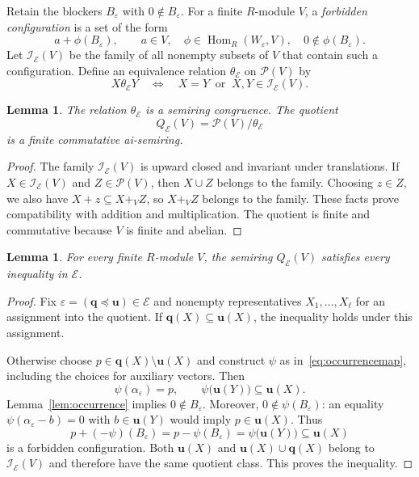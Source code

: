 \documentclass[11pt,reqno]{amsart}
\newtheorem{lemma}[theorem]{Lemma}
\theoremstyle{definition}
\numberwithin{equation}{section}
\newcommand{\Pow}{\mathcal{P}}
\newcommand{\Hom}{\operatorname{Hom}}
\newcommand{\bu}{\mathbf{u}}
\newcommand{\bq}{\mathbf{q}}
\newcommand{\calI}{\mathcal{I}}
\newcommand{\calE}{\mathcal{E}}
\begin{document}
Retain the blockers $B_\varepsilon$ with $0\notin B_\varepsilon$. For a finite $R$-module $V$, a \emph{forbidden configuration} is a set of the form
\begin{equation}\label{eq:forbidden}
 a+\phi(B_\varepsilon),\qquad
 a\in V,\quad\phi\in\Hom_R(W_\varepsilon,V),\quad
 0\notin\phi(B_\varepsilon).
\end{equation}
Let $\calI_{\calE}(V)$ be the family of all nonempty subsets of $V$ that contain such a configuration. Define an equivalence relation $\theta_{\calE}$ on $\Pow(V)$ by
\[
 X\mathrel{\theta_{\calE}}Y
 \quad\Longleftrightarrow\quad
 X=Y\ \text{ or }\ X,Y\in\calI_{\calE}(V).
\]

\begin{lemma}\label{lem:congruence}
The relation $\theta_{\calE}$ is a semiring congruence. The quotient
\[
 Q_{\calE}(V)=\Pow(V)/\theta_{\calE}
\]
is a finite commutative ai-semiring.
\end{lemma}
\begin{proof}
The family $\calI_{\calE}(V)$ is upward closed and invariant under translations. If $X\in\calI_{\calE}(V)$ and $Z\in\Pow(V)$, then $X\cup Z$ belongs to the family. Choosing $z\in Z$, we also have $X+z\subseteq X+_V Z$, so $X+_V Z$ belongs to the family. These facts prove compatibility with addition and multiplication. The quotient is finite and commutative because $V$ is finite and abelian.
\end{proof}

\begin{lemma}\label{lem:fragmentmodel}
For every finite $R$-module $V$, the semiring $Q_{\calE}(V)$ satisfies every inequality in $\calE$.
\end{lemma}
\begin{proof}
Fix $\varepsilon=(\bq\preceq\bu)\in\calE$ and nonempty representatives $X_1,\ldots,X_\ell$ for an assignment into the quotient. If $\bq(X)\subseteq\bu(X)$, the inequality holds under this assignment.

Otherwise choose $p\in\bq(X)\setminus\bu(X)$ and construct $\psi$ as in~\eqref{eq:occurrencemap}, including the choices for auxiliary vectors. Then
\[
 \psi(\alpha_\varepsilon)=p,\qquad
 \psi\bigl(\bu(Y)\bigr)\subseteq\bu(X).
\]
Lemma~\ref{lem:occurrence} implies $0\notin B_\varepsilon$. Moreover, $0\notin\psi(B_\varepsilon)$: an equality $\psi(\alpha_\varepsilon-b)=0$ with $b\in\bu(Y)$ would imply $p\in\bu(X)$. Thus
\begin{equation}\label{eq:forcing}
 p+(-\psi)(B_\varepsilon)
 =p-\psi(B_\varepsilon)
 =\psi\bigl(\bu(Y)\bigr)\subseteq\bu(X)
\end{equation}
is a forbidden configuration. Both $\bu(X)$ and $\bu(X)\cup\bq(X)$ belong to $\calI_{\calE}(V)$ and therefore have the same quotient class. This proves the inequality.
\end{proof}
\end{document}
